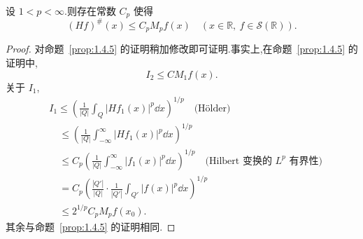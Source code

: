 \begin{corollary}\label{cor:1.7.4}
设 $1 < p < \infty$.则存在常数 $C_{p}$ 使得
\begin{equation*}
(Hf)^{\#}(x) \leq C_{p}M_{p}f(x) \quad (x \in \mathbb{R},\ f \in \mathcal{S}(\mathbb{R})).
\end{equation*}
\end{corollary}

\begin{proof}
对命题~\ref{prop:1.4.5} 的证明稍加修改即可证明.事实上,在命题~\ref{prop:1.4.5} 的证明中,
\begin{equation*}
I_{2} \leq CM_{1}f(x).
\end{equation*}
关于 $I_{1}$,
\begin{align*}
& I_{1} \leq \left(\frac{1}{|Q|}\int_{Q}|Hf_{1}(x)|^{p}\dd x\right)^{1/p} \quad \text{(Hölder)} \\
& \quad \leq \left(\frac{1}{|Q|}\int_{-\infty}^{\infty}|Hf_{1}(x)|^{p}\dd x\right)^{1/p} \\
& \quad \leq C_{p}\left(\frac{1}{|Q|}\int_{-\infty}^{\infty}|f_{1}(x)|^{p}\dd x\right)^{1/p} \quad \text{(Hilbert 变换的 $L^{p}$ 有界性)} \\
& \quad = C_{p}\left(\frac{|Q'|}{|Q|}\cdot\frac{1}{|Q'|}\int_{Q'}|f(x)|^{p}\dd x\right)^{1/p} \\
& \quad \leq 2^{1/p}C_{p}M_{p}f(x_{0}).
\end{align*}
其余与命题~\ref{prop:1.4.5} 的证明相同.
\end{proof}

